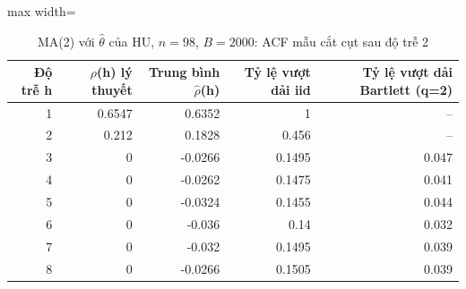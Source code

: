 \begin{table}[H]
\centering\footnotesize
\caption{MA(2) với $\hat\theta$ của HU, $n=98$, $B=2000$: ACF mẫu cắt cụt sau độ trễ 2}\label{tab:tab_b11_09_ma2_simulation}
\begin{adjustbox}{max width=\linewidth}
\begin{tabular}{|r|r|r|r|r|}
\toprule
Độ trễ h & $\rho$(h) lý thuyết & Trung bình $\hat{\rho}$(h) & Tỷ lệ vượt dải iid & Tỷ lệ vượt dải Bartlett (q=2) \\
\midrule
1 & 0.6547 & 0.6352 & 1 & – \\
2 & 0.212 & 0.1828 & 0.456 & – \\
3 & 0 & -0.0266 & 0.1495 & 0.047 \\
4 & 0 & -0.0262 & 0.1475 & 0.041 \\
5 & 0 & -0.0324 & 0.1455 & 0.044 \\
6 & 0 & -0.036 & 0.14 & 0.032 \\
7 & 0 & -0.032 & 0.1495 & 0.039 \\
8 & 0 & -0.0266 & 0.1505 & 0.039 \\
\bottomrule
\end{tabular}
\end{adjustbox}\par{}
\end{table}
